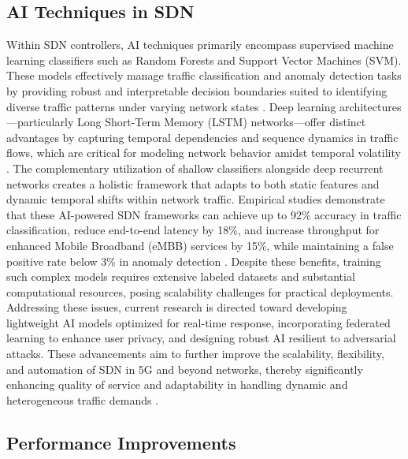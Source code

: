 \documentclass[sigconf]{acmart}
\begin{document}
\subsection{AI Techniques in SDN}

Within SDN controllers, AI techniques primarily encompass supervised machine learning classifiers such as Random Forests and Support Vector Machines (SVM). These models effectively manage traffic classification and anomaly detection tasks by providing robust and interpretable decision boundaries suited to identifying diverse traffic patterns under varying network states \cite{ref52}. Deep learning architectures—particularly Long Short-Term Memory (LSTM) networks—offer distinct advantages by capturing temporal dependencies and sequence dynamics in traffic flows, which are critical for modeling network behavior amidst temporal volatility \cite{ref52}. The complementary utilization of shallow classifiers alongside deep recurrent networks creates a holistic framework that adapts to both static features and dynamic temporal shifts within network traffic. Empirical studies demonstrate that these AI-powered SDN frameworks can achieve up to 92\% accuracy in traffic classification, reduce end-to-end latency by 18\%, and increase throughput for enhanced Mobile Broadband (eMBB) services by 15\%, while maintaining a false positive rate below 3\% in anomaly detection \cite{ref52}. Despite these benefits, training such complex models requires extensive labeled datasets and substantial computational resources, posing scalability challenges for practical deployments. Addressing these issues, current research is directed toward developing lightweight AI models optimized for real-time response, incorporating federated learning to enhance user privacy, and designing robust AI resilient to adversarial attacks. These advancements aim to further improve the scalability, flexibility, and automation of SDN in 5G and beyond networks, thereby significantly enhancing quality of service and adaptability in handling dynamic and heterogeneous traffic demands \cite{ref52}.

\subsection{Performance Improvements}
\end{document}
